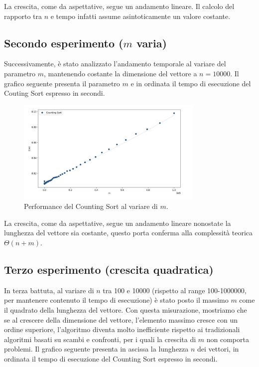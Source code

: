 \documentclass[a4paper, 12pt, oneside]{book}
\begin{document}
\noindent La crescita, come da aspettative, segue un andamento lineare. Il calcolo del rapporto tra $n$ e tempo infatti assume asintoticamente un valore costante.


\subsection{Secondo esperimento ($m$ varia)}

\noindent Successivamente, è stato analizzato l'andamento temporale al variare del parametro \(m\), mantenendo costante la dimensione del vettore a \(n = 10000\). 
Il grafico seguente presenta il parametro \(m\) e in ordinata il tempo di esecuzione del Couting Sort espresso in secondi.

\begin{figure}[H]
    \centering
    \includegraphics[width=0.8\textwidth]{images/grafico_counting_sort_m.png}
    \caption{Performance del Counting Sort al variare di \(m\).}
    \label{fig:counting_sort_m}
\end{figure}

\noindent La crescita, come da aspettative, segue un andamento lineare nonostate la lunghezza del vettore sia costante, questo porta conferma alla complessità teorica $\Theta(n+m)$.


\subsection{Terzo esperimento (crescita quadratica)}


\noindent In terza battuta, al variare di \(n\) tra 100 e 10000 (rispetto al range 100-1000000, per mantenere contenuto il tempo di esecuzione) è stato posto il massimo \(m\) come il quadrato della lunghezza del vettore. Con questa misurazione, mostriamo che se al crescere della dimensione del vettore, l'elemento massimo cresce con un ordine superiore, l'algoritmo diventa molto inefficiente rispetto ai tradizionali algoritmi basati su scambi e confronti, per i quali la crescita di \(m\) non comporta problemi. 
Il grafico seguente presenta in ascissa la lunghezza \(n\) dei vettori, in ordinata il tempo di esecuzione del Counting Sort espresso in secondi.
\end{document}
